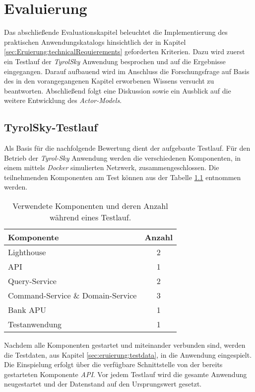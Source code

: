 \chapter{Evaluierung} 
\label{cha:evaluation}
Das abschließende Evaluationskapitel beleuchtet die Implementierung des praktischen Anwendungskatalogs hinsichtlich der in Kapitel \ref{sec:Eruierung:technicalRequierements} geforderten Kriterien. Dazu wird zuerst ein Testlauf der \textit{TyrolSky} Anwendung besprochen und auf die Ergebnisse eingegangen. Darauf aufbauend wird im Anschluss die Forschungsfrage auf Basis des in den vorangegangenen Kapitel erworbenen Wissens versucht zu beantworten. Abschließend folgt eine Diskussion sowie ein Ausblick auf die weitere Entwicklung des \textit{Actor-Models}. 

\section{TyrolSky-Testlauf}
Als Basis für die nachfolgende Bewertung dient der aufgebaute Testlauf. Für den Betrieb der \textit{Tyrol-Sky} Anwendung werden die verschiedenen Komponenten, in einem mittels \textit{Docker} simulierten Netzwerk, zusammengeschlossen. Die teilnehmenden Komponenten am Test können aus der Tabelle \ref{tab:evaluation:testStage} entnommen werden. \\
\begin{table}
    \centering
    \begin{tabular}{lc}
        Komponente       &   Anzahl  \\ \hline
        Lighthouse       &   2       \\
        API              &   1       \\
        Query-Service    &   2       \\
        Command-Service \& Domain-Service  &   3       \\
        Bank APU         &   1       \\
        Testanwendung    &   1
    \end{tabular}
    \caption{Verwendete Komponenten und deren Anzahl während eines Testlauf.}
    \label{tab:evaluation:testStage}
\end{table}
Nachdem alle Komponenten gestartet und miteinander verbunden sind, werden die Testdaten, aus Kapitel \ref{sec:eruierung:testdata}, in die Anwendung eingespielt. Die Einspielung erfolgt über die verfügbare Schnittstelle von der bereits gestarteten Komponente \textit{API}. Vor jedem Testlauf wird die gesamte Anwendung neugestartet und der Datenstand auf den Ursprungswert gesetzt. \\

